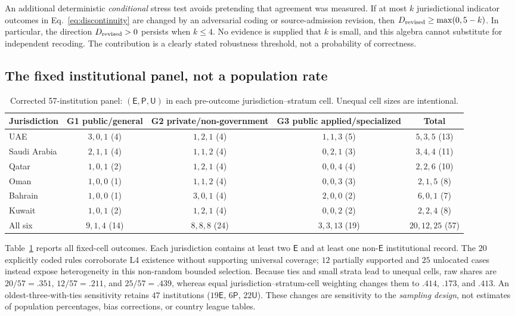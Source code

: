 \documentclass[conference,letterpaper]{IEEEtran}
\newcommand{\stE}{\textsf{E}}
\newcommand{\stP}{\textsf{P}}
\newcommand{\stU}{\textsf{U}}
\begin{document}
An additional deterministic \emph{conditional} stress test avoids pretending that agreement was measured. If at most $k$ jurisdictional indicator outcomes in Eq.~\eqref{eq:discontinuity} are changed by an adversarial coding or source-admission revision, then $D_{\rm revised}\geq\max(0,5-k)$. In particular, the direction $D_{\rm revised}>0$ persists when $k\leq4$. No evidence is supplied that $k$ is small, and this algebra cannot substitute for independent recoding. The contribution is a clearly stated robustness threshold, not a probability of correctness.

\subsection{The fixed institutional panel, not a population rate}
\begin{table}[t]
\centering\caption{Corrected 57-institution panel: $(\stE,\stP,\stU)$ in each pre-outcome jurisdiction--stratum cell. Unequal cell sizes are intentional.}\label{tab:institution}
\footnotesize
\begin{tabularx}{\textwidth}{@{}lcccc@{}}
\toprule
Jurisdiction & G1 public/general & G2 private/non-government & G3 public applied/specialized & Total\tabularnewline\midrule
UAE & $3,0,1$ (4) & $1,2,1$ (4) & $1,1,3$ (5) & $5,3,5$ (13)\tabularnewline
Saudi Arabia & $2,1,1$ (4) & $1,1,2$ (4) & $0,2,1$ (3) & $3,4,4$ (11)\tabularnewline
Qatar & $1,0,1$ (2) & $1,2,1$ (4) & $0,0,4$ (4) & $2,2,6$ (10)\tabularnewline
Oman & $1,0,0$ (1) & $1,1,2$ (4) & $0,0,3$ (3) & $2,1,5$ (8)\tabularnewline
Bahrain & $1,0,0$ (1) & $3,0,1$ (4) & $2,0,0$ (2) & $6,0,1$ (7)\tabularnewline
Kuwait & $1,0,1$ (2) & $1,2,1$ (4) & $0,0,2$ (2) & $2,2,4$ (8)\tabularnewline\midrule
All six & $9,1,4$ (14) & $8,8,8$ (24) & $3,3,13$ (19) & $20,12,25$ (57)\tabularnewline
\bottomrule
\end{tabularx}
\end{table}

Table~\ref{tab:institution} reports all fixed-cell outcomes. Each jurisdiction contains at least two $\stE$ and at least one non-$\stE$ institutional record. The $20$ explicitly coded rules corroborate L4 existence without supporting universal coverage; $12$ partially supported and $25$ unlocated cases instead expose heterogeneity in this non-random bounded selection. Because ties and small strata lead to unequal cells, raw shares are $20/57=.351$, $12/57=.211$, and $25/57=.439$, whereas equal jurisdiction--stratum-cell weighting changes them to $.414$, $.173$, and $.413$. An oldest-three-with-ties sensitivity retains $47$ institutions ($19\stE$, $6\stP$, $22\stU$). These changes are sensitivity to the \emph{sampling design}, not estimates of population percentages, bias corrections, or country league tables.
\end{document}

